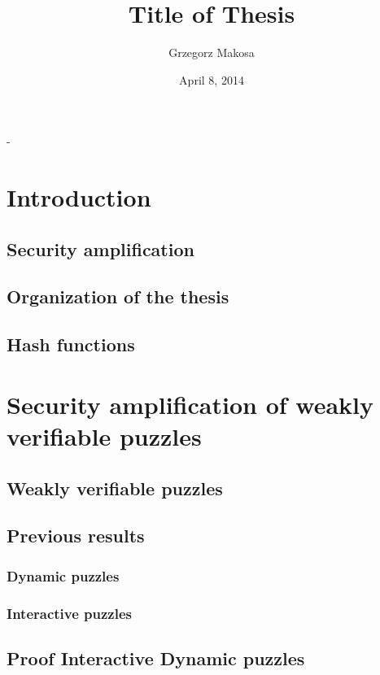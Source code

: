 \documentclass[11pt,a4paper,titlepage]{memoir}
\title{Title of Thesis}
\author{Grzegorz Makosa}
\date{April 8, 2014}
\begin{document}
\frontmatter

\begin{titlingpage}
  \calccentering{\unitlength}
  \begin{adjustwidth*}{\unitlength-24pt}{-\unitlength-24pt}
    \maketitle
  \end{adjustwidth*}
\end{titlingpage}



\cleartorecto
\tableofcontents
\mainmatter

\chapter{Introduction}
\section{Security amplification}
\section{Organization of the thesis}

\section{Hash functions}
\chapter{Security amplification of weakly verifiable puzzles}
\section{Weakly verifiable puzzles}
\section{Previous results}
\subsection{Dynamic puzzles}
\subsection{Interactive puzzles}
\section{Proof Interactive Dynamic puzzles}
\end{document}

